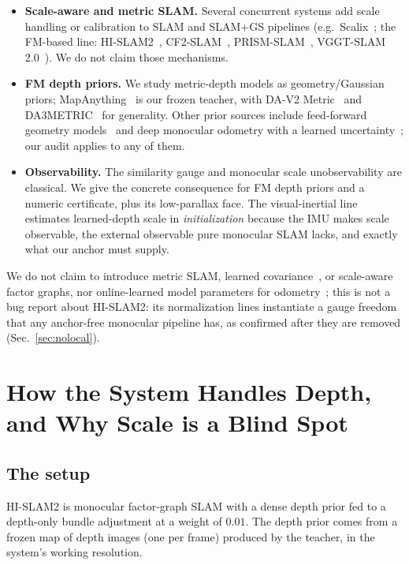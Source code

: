 \begin{itemize}
\item \textbf{Scale-aware and metric SLAM.} Several concurrent systems add scale
  handling or calibration to SLAM and SLAM+GS pipelines (e.g.\
  Scalix~\cite{scalix}; the FM-based line: HI-SLAM2~\cite{hislam2},
  CF2-SLAM~\cite{cf2slam}, PRISM-SLAM~\cite{prismslam}, VGGT-SLAM
  2.0~\cite{vggtslam2}). We do not claim those mechanisms.
\item \textbf{FM depth priors.} We study metric-depth models as
  geometry/Gaussian priors; MapAnything~\cite{mapanything} is our frozen teacher,
  with DA-V2 Metric~\cite{depthanythingv2} and DA3METRIC~\cite{da3} for
  generality. Other prior sources include feed-forward geometry
  models~\cite{vggt,vggtslam} and deep monocular odometry with a learned
  uncertainty~\cite{d3vo}; our audit applies to any of them.
\item \textbf{Observability.} The similarity gauge and monocular scale
  unobservability are classical. We give the concrete consequence for FM depth
  priors and a numeric certificate, plus its low-parallax face. The
  visual-inertial line~\cite{merrill,hailu,hdvio2} estimates learned-depth scale in
  \emph{initialization} because the IMU makes scale observable, the external
  observable pure monocular SLAM lacks, and exactly what our anchor must supply.
\end{itemize}

We do not claim to introduce metric SLAM, learned covariance~\cite{macvo}, or
scale-aware factor graphs, nor online-learned model parameters for
odometry~\cite{okawara}; this is not a bug report about HI-SLAM2: its
normalization lines instantiate a gauge freedom that any anchor-free monocular
pipeline has, as confirmed after they are removed (Sec.~\ref{sec:nolocal}).

\section{How the System Handles Depth, and Why Scale is a Blind Spot}

\subsection{The setup}

HI-SLAM2 is monocular factor-graph SLAM with a dense depth prior fed to a
depth-only bundle adjustment at a weight of $0.01$. The depth prior comes from a frozen map of
depth images (one per frame) produced by the teacher, in the system's working
resolution.

